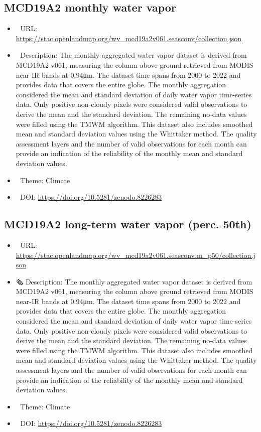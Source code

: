 \documentclass[
  graybox,natbib,nospthms]{svmono}
\providecommand{\tightlist}{%
  \setlength{\itemsep}{0pt}\setlength{\parskip}{0pt}}
\providecommand{\tightlist}{\setlength{\itemsep}{0pt}\setlength{\parskip}{0pt}}
\begin{document}
\hypertarget{mcd19a2-monthly-water-vapor}{%
\subsection{MCD19A2 monthly water vapor}\label{mcd19a2-monthly-water-vapor}}

\begin{itemize}
\tightlist
\item
  🔗 URL: \url{https://stac.openlandmap.org/wv_mcd19a2v061.seasconv/collection.json}
\item
  📰 Description: The monthly aggregated water vapor dataset is derived from MCD19A2 v061, measuring the column above ground retrieved from MODIS near-IR bands at 0.94μm. The dataset time spans from 2000 to 2022 and provides data that covers the entire globe. The monthly aggregation considered the mean and standard deviation of daily water vapor time-series data. Only positive non-cloudy pixels were considered valid observations to derive the mean and the standard deviation. The remaining no-data values were filled using the TMWM algorithm. This dataset also includes smoothed mean and standard deviation values using the Whittaker method. The quality assessment layers and the number of valid observations for each month can provide an indication of the reliability of the monthly mean and standard deviation values.
\item
  📝 Theme: Climate
\item
  📂 DOI: \url{https://doi.org/10.5281/zenodo.8226283}
\end{itemize}

\hypertarget{mcd19a2-long-term-water-vapor-perc.-50th}{%
\subsection{MCD19A2 long-term water vapor (perc. 50th)}\label{mcd19a2-long-term-water-vapor-perc.-50th}}

\begin{itemize}
\tightlist
\item
  🔗 URL: \url{https://stac.openlandmap.org/wv_mcd19a2v061.seasconv.m_p50/collection.json}
\item
  🗞 Description: The monthly aggregated water vapor dataset is derived from MCD19A2 v061, measuring the column above ground retrieved from MODIS near-IR bands at 0.94μm. The dataset time spans from 2000 to 2022 and provides data that covers the entire globe. The monthly aggregation considered the mean and standard deviation of daily water vapor time-series data. Only positive non-cloudy pixels were considered valid observations to derive the mean and the standard deviation. The remaining no-data values were filled using the TMWM algorithm. This dataset also includes smoothed mean and standard deviation values using the Whittaker method. The quality assessment layers and the number of valid observations for each month can provide an indication of the reliability of the monthly mean and standard deviation values.
\item
  📝 Theme: Climate
\item
  📂 DOI: \url{https://doi.org/10.5281/zenodo.8226283}
\end{itemize}
\end{document}
